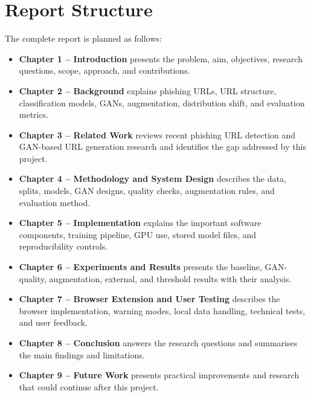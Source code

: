 \section{Report Structure}

The complete report is planned as follows:

\begin{itemize}
\item \textbf{Chapter 1 -- Introduction} presents the problem, aim, objectives,
research questions, scope, approach, and contributions.

\item \textbf{Chapter 2 -- Background} explains phishing URLs, URL structure,
classification models, GANs, augmentation, distribution shift, and evaluation
metrics.

\item \textbf{Chapter 3 -- Related Work} reviews recent phishing URL detection
and GAN-based URL generation research and identifies the gap addressed by this
project.

\item \textbf{Chapter 4 -- Methodology and System Design} describes the data,
splits, models, GAN designs, quality checks, augmentation rules, and evaluation
method.

\item \textbf{Chapter 5 -- Implementation} explains the important software
components, training pipeline, GPU use, stored model files, and reproducibility
controls.

\item \textbf{Chapter 6 -- Experiments and Results} presents the baseline,
GAN-quality, augmentation, external, and threshold results with their analysis.

\item \textbf{Chapter 7 -- Browser Extension and User Testing} describes the
browser implementation, warning modes, local data handling, technical tests,
and user feedback.

\item \textbf{Chapter 8 -- Conclusion} answers the research questions and
summarises the main findings and limitations.

\item \textbf{Chapter 9 -- Future Work} presents practical improvements and
research that could continue after this project.
\end{itemize}

